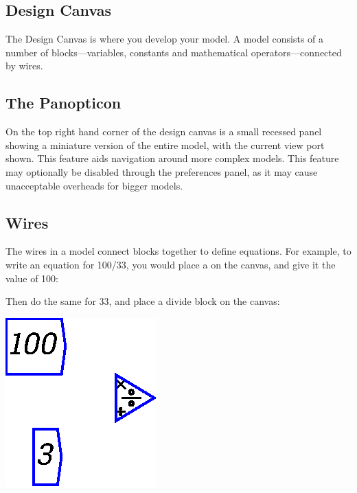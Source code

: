 \subsection{Design Canvas}
\label{DesignCanvas}

The Design Canvas is where you develop your model. A model consists of
a number of blocks---variables, constants and mathematical
operators---connected by wires. 


\subsection{The Panopticon}\label{Panopticon}

On the top right hand corner of the design canvas is a small recessed
panel showing a miniature version of the entire model, with the
current view port shown. This feature aids navigation around more
complex models. This feature may optionally be disabled through the
preferences panel, as it may cause unacceptable overheads for bigger models.

\subsection{Wires}
\label{Wires}

The wires in a model connect blocks together to define equations. For
example, to write an equation for 100/33, you would place a
 on the canvas, and give it the value of 100:

\begin{center}
\end{center}

Then do the same for 33, and place a divide block on the canvas:

\begin{center}
\includegraphics{images/NewItem123.eps}
\end{center}

